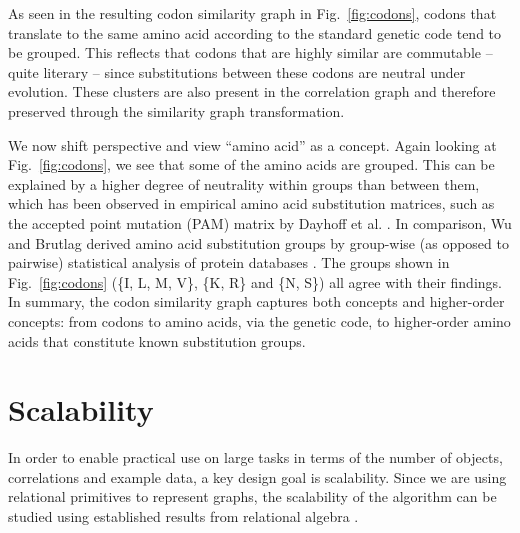 \documentclass[conference]{IEEEtran}
\begin{document}
As seen in the resulting codon similarity graph in Fig.\ \ref{fig:codons}, codons that translate to the same amino acid according
to the standard genetic code \cite{Nirenberg65} tend to be grouped. This reflects that codons that are highly similar
are commutable -- quite literary -- since substitutions between these codons are neutral under evolution. These clusters are also
present in the correlation graph and therefore preserved through the similarity graph transformation.

We now shift perspective and view ``amino acid'' as a concept. Again looking at Fig.\ \ref{fig:codons},
we see that some of the amino acids are grouped. This can be explained by a higher degree of neutrality within groups
than between them, which has been observed in empirical amino acid substitution matrices, such as the accepted point
mutation (PAM) matrix by Dayhoff et al. \cite{Dayhoff78}. In comparison, Wu and Brutlag derived amino acid substitution
groups by group-wise (as opposed to pairwise) statistical analysis of protein databases \cite{Wu96}.  The groups shown
in Fig.\ \ref{fig:codons} (\{I, L, M, V\}, \{K, R\} and \{N, S\}) all agree with their findings. In summary, the codon similarity 
graph captures both concepts and higher-order concepts: from codons to amino acids, via the genetic code,
to higher-order amino acids that constitute known substitution groups.

\section{Scalability}
\label{sec: scalability}

In order to enable practical use on large tasks in terms of the number of objects, correlations and example data,
a key design goal is scalability. Since we are using
relational primitives to represent graphs,
the scalability of the algorithm can be studied using established results from
relational algebra \cite{Chandra77, bitton83}. 
\end{document}
